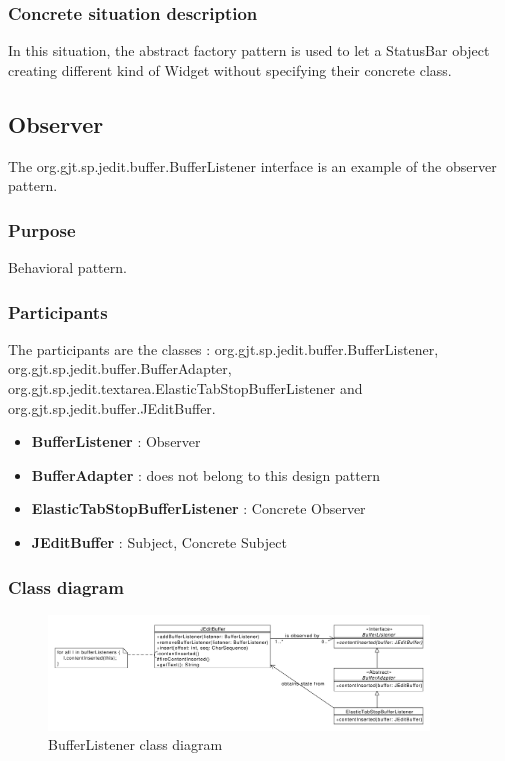 \documentclass[a4paper,10pt]{article}
\begin{document}
\subsubsection{Concrete situation description}
In this situation, the abstract factory pattern is used to let a StatusBar object creating different kind of Widget without specifying their concrete class. 

\subsection{Observer}
The org.gjt.sp.jedit.buffer.BufferListener interface is an example of the observer pattern.

\subsubsection{Purpose}
Behavioral pattern.
\subsubsection[Participants]{Participants\footnotemark[1]}
The participants are the classes : org.gjt.sp.jedit.buffer.BufferListener, org.gjt.sp.jedit.buffer.BufferAdapter, org.gjt.sp.jedit.textarea.ElasticTabStopBufferListener and org.gjt.sp.jedit.buffer.JEditBuffer.

\begin{itemize}
 \item \textbf{BufferListener} : Observer
 \item \textbf{BufferAdapter} : does not belong to this design pattern
 \item \textbf{ElasticTabStopBufferListener} : Concrete Observer
 \item \textbf{JEditBuffer} : Subject, Concrete Subject
\end{itemize}

\subsubsection{Class diagram}
\begin{center}
\begin{figure}[h]
  \centerline{\includegraphics[width=0.9\textwidth]{observer-bufferlistener-class-diagram.pdf}}
  \caption{BufferListener class diagram}
\end{figure}
\end{center}
\end{document}
